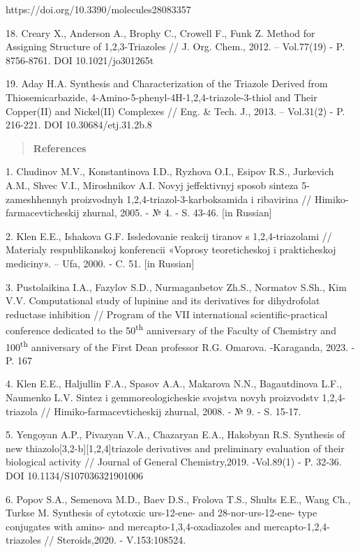 https://doi.org/10.3390/molecules28083357

18. Creary X., Anderson A., Brophy C., Crowell F., Funk Z. Method for
Assigning Structure of 1,2,3-Triazoles // J. Org. Chem., 2012. --
Vol.77(19) - P. 8756-8761. DOI 10.1021/jo301265t

19. Aday H.A. Synthesis and Characterization of the Triazole Derived
from Thiosemicarbazide, 4-Amino-5-phenyl-4H-1,2,4-triazole-3-thiol and
Their Copper(II) and Nickel(II) Complexes // Eng. \& Tech. J., 2013. --
Vol.31(2) - P. 216-221. DOI 10.30684/etj.31.2b.8

\begin{quote}
\textbf{References}
\end{quote}

1. Chudinov M.V., Konstantinova I.D., Ryzhova O.I., Esipov R.S.,
Jurkevich A.M., Shvec V.I., Miroshnikov A.I. Novyj jeffektivnyj sposob
sinteza 5-zameshhennyh proizvodnyh 1,2,4-triazol-3-karboksamida i
ribavirina // Himiko-farmacevticheskij zhurnal, 2005. - № 4. - S. 43-46.
{[}in Russian{]}

2. Klen E.E., Ishakova G.F. Issledovanie reakcij tiranov s
1,2,4-triazolami // Materialy respublikanskoj konferencii «Voprosy
teoreticheskoj i prakticheskoj mediciny». -- Ufa, 2000. - C. 51. {[}in
Russian{]}

3. Pustolaikina I.A., Fazylov S.D., Nurmaganbetov Zh.S., Normatov S.Sh.,
Kim V.V. Computational study of lupinine and its derivatives for
dihydrofolat reductase inhibition // Program of the VII international
scientific-practical conference dedicated to the 50\textsuperscript{th}
anniversary of the Faculty of Chemistry and 100\textsuperscript{th}
anniversary of the First Dean professor R.G. Omarova. -Karaganda, 2023.
- P. 167

4. Klen E.E., Haljullin F.A., Spasov A.A., Makarova N.N., Bagautdinova
L.F., Naumenko L.V. Sintez i gemmoreologicheskie svojstva novyh
proizvodstv 1,2,4-triazola // Himiko-farmacevticheskij zhurnal, 2008. -
№ 9. - S. 15-17.

5. Yengoyan A.P., Pivazyan V.A., Chazaryan E.A., Hakobyan R.S. Synthesis
of new thiazolo{[}3,2-b{]}{[}1,2,4{]}triazole derivatives and
preliminary evaluation of their biological activity // Journal of
General Chemistry,2019. -Vol.89(1) - P. 32-36. DOI
10.1134/S107036321901006

6. Popov S.A., Semenova M.D., Baev D.S., Frolova T.S., Shults E.E., Wang
Ch., Turkse M. Synthesis of cytotoxic urs-12-ene- and 28-nor-urs-12-ene-
type conjugates with amino- and mercapto-1,3,4-oxadiazoles and
mercapto-1,2,4-triazoles // Steroids,2020. - V.153:108524.


